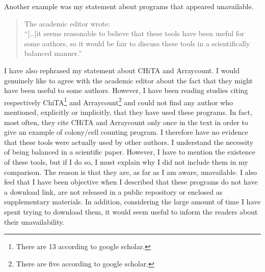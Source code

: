 \documentclass{letter}
\begin{document}
\begin{letter}{}
Another example was my statement about programs that appeared unavailable.
\begin{quote}
The academic editor wrote:\\
``[\ldots]it seems reasonable to believe that these tools have been useful for some authors, so it would be fair to discuss these tools in a scientifically balanced manner.''
\end{quote}
I have also rephrased my statement about CHiTA and Arraycount. 
I would genuinely like to agree with the academic editor about 
the fact that they might have been useful to some authors.
However, I have been reading studies citing respectively ChiTA\footnote{There are 13 according to google scholar.}
and Arraycount\footnote{There are five according to google scholar.} and could not find any
author who mentioned, explicitly or implicitly, that they have used these programs. 
In fact, most often, they cite CHiTA and Arraycount only once in the text 
in order to give an example of colony/cell counting program. 
I therefore have no evidence that these tools were actually used by other authors.
I understand the necessity of being balanced in a scientific paper.
However, I have to mention the existence of these tools, but if I do so, 
I must explain why I did not include them in my comparison.
The reason is 
that 
they are, as far as I am aware, unavailable. 
I also feel that I have been objective when I described that these programs
do not have a download link,
are not released in a public repository or enclosed as supplementary materials.
In addition, considering the large amount of time I 
have spent
trying to download them, 
it would seem useful to inform the readers about 
their 
unavailability.



\end{letter}
\end{document}
